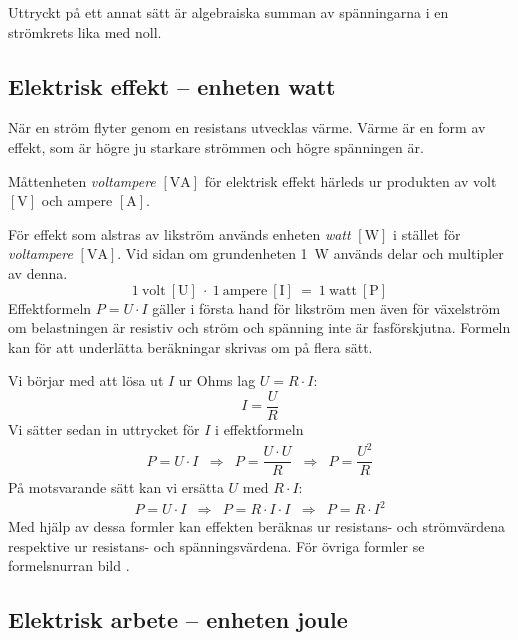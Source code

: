Uttryckt på ett annat sätt är algebraiska summan av spänningarna i en
strömkrets lika med noll.

\subsection{Elektrisk effekt -- enheten watt}
\label{elektrisk_effekt}

När en ström flyter genom en resistans utvecklas värme.
Värme är en form av effekt, som är högre ju starkare strömmen och högre
spänningen är.

Måttenheten \emph{voltampere} \(\mathrm{[VA]}\) för elektrisk effekt härleds ur
produkten av volt \(\mathrm{[V]}\) och ampere \(\mathrm{[A]}\).

För effekt som alstras av likström används enheten \emph{watt} \(\mathrm{[W]}\)
\cite{SIbrochure8} i stället för \emph{voltampere} \(\mathrm{[VA]}\).
Vid sidan om grundenheten \qty{1}{\watt} används delar och multipler av denna.
\[1\ \mathrm{volt\ [U]}\ \cdot\ 1\ \mathrm{ampere\ [I]}\ =\ 1\ \mathrm{watt\ [P]}\]
Effektformeln \(P = U \cdot I\) gäller i första hand för likström men även för
växelström om belastningen är resistiv och ström och spänning inte är
fasförskjutna.
Formeln kan för att underlätta beräkningar skrivas om på flera sätt.

Vi börjar med att lösa ut $I$ ur Ohms lag $U = R \cdot I$:
\[
I = \dfrac{U}{R}
\]
Vi sätter sedan in uttrycket för $I$ i effektformeln
\[
\begin{array}{lllll}
P=U \cdot I & \Rightarrow & P= \dfrac{U \cdot U}{R} & \Rightarrow & P= \dfrac{U^2}{R}
\end{array}
\]
På motsvarande sätt kan vi ersätta $U$ med $R \cdot I$:
\[
\begin{array}{lllll}
P=U \cdot I & \Rightarrow & P = R \cdot I \cdot I  & \Rightarrow & P = R \cdot I^2
\end{array}
\]
Med hjälp av dessa formler kan effekten beräknas ur resistans- och strömvärdena
respektive ur resistans- och spänningsvärdena.
För övriga formler se formelsnurran bild .

\subsection{Elektrisk arbete -- enheten joule}

